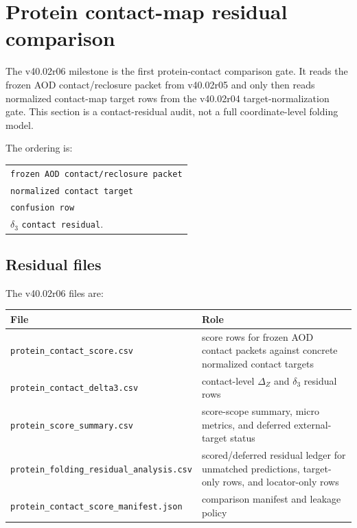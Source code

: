 \section{Protein contact-map residual comparison}

The v40.02r06 milestone is the first protein-contact comparison gate. It reads the frozen AOD contact/reclosure packet from v40.02r05 and only then reads normalized contact-map target rows from the v40.02r04 target-normalization gate. This section is a contact-residual audit, not a full coordinate-level folding model.

The ordering is:
\begin{center}
\begin{tabularx}{\linewidth}{@{}X@{}}
\texttt{frozen AOD contact/reclosure packet} \\ 
\textrightarrow{} \texttt{normalized contact target} \\ 
\textrightarrow{} \texttt{confusion row} \\ 
\textrightarrow{} $\delta_3$ \texttt{contact residual}.
\end{tabularx}
\end{center}

\subsection{Residual files}

The v40.02r06 files are:
\begin{center}
\begin{tabularx}{\linewidth}{@{}lX@{}}
\toprule
File & Role \\
\midrule
\texttt{protein\_contact\_score.csv} & score rows for frozen AOD contact packets against concrete normalized contact targets \\
\texttt{protein\_contact\_delta3.csv} & contact-level $\Delta_Z$ and $\delta_3$ residual rows \\
\texttt{protein\_score\_summary.csv} & score-scope summary, micro metrics, and deferred external-target status \\
\texttt{protein\_folding\_residual\_analysis.csv} & scored/deferred residual ledger for unmatched predictions, target-only rows, and locator-only rows \\
\texttt{protein\_contact\_score\_manifest.json} & comparison manifest and leakage policy \\
\bottomrule
\end{tabularx}
\end{center}

